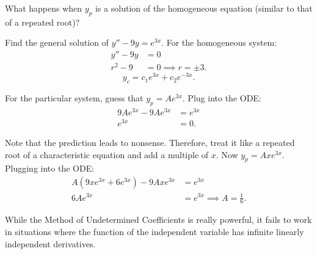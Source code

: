 \documentclass[../notes.tex]{subfiles}
\begin{document}
What happens when $y_p$ is a solution of the homogeneous equation (similar to that of a repeated root)?

\begin{example}{Find the general solution of $y'' - 9y = e^{3x}$.}
For the homogeneous system:
\begin{align*}
				y'' -9y &= 0 \\
				r^2 - 9 &= 0 \implies r = \pm 3
.\end{align*}
\[
				\boxed{y_c = c_1 e^{3x} + c_2 e^{-3x}.}
\] 

For the particular system, guess that $y_p = Ae^{3x}$. Plug into the ODE:
\begin{align*}
				9Ae^{3x} - 9Ae^{3x} &= e^{3x} \\
				e^{3x} &= 0
.\end{align*}

Note that the prediction leads to nonsense. Therefore, treat it like a repeated root of a characteristic equation and add a multiple of $x$. Now  $y_p = Axe^{3x}$. Plugging into the ODE:
\begin{align*}
				A(9xe^{3x} + 6e^{3x}) - 9Axe^{3x} &= e^{3x} \\
				6Ae^{3x} &= e^{3x} \implies A = \frac{1}{6}
.\end{align*}

While the Method of Undetermined Coefficients is really powerful, it fails to work in situations where the function of the independent variable has infinite linearly independent derivatives.
\end{example}
\end{document}
